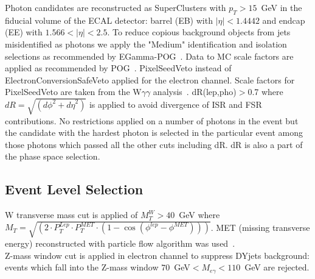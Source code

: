 Photon candidates are reconstructed as SuperClusters with 
$p_{T} > 15$~GeV in the fiducial volume of the ECAL detector:
barrel (EB) with $|\eta|<1.4442$ and endcap (EE) with 
$1.566 < |\eta| < 2.5$. To reduce copious background objects from jets misidentified as photons 
we apply the "Medium" identification and isolation selections as recommended by EGamma-POG~\cite{phoPOG}.
Data to MC scale factors are applied as recommended by POG~\cite{SFphoPOG}.
PixelSeedVeto instead of ElectronConversionSafeVeto applied for the electron channel. Scale factors for PixelSeedVeto are taken from the W$\gamma\gamma$ analysis~\cite{Wgg8TeV}.
dR(lep,pho)$>$0.7 where $dR=\sqrt{({d\phi}^2+{d\eta}^2)}$ 
is applied to avoid divergence of ISR and FSR contributions. No restrictions applied on a number of
 photons in the event but the candidate with the hardest photon is selected in the particular event among 
those photons which passed all the other cuts including dR. dR is also a part of the phase space selection.\\

\subsection{Event Level Selection}
W transverse mass cut is applied of $M_T^W>40$~GeV where $M_T=\sqrt{(2 \cdot P_T^{Lep} \cdot P_T^{MET} \cdot (1-\cos{(\phi^{lep}-\phi^{MET})}))}$. MET (missing transverse energy) reconstructed with particle flow algorithm was used~\cite{pfMET}. \\

Z-mass window cut is applied in electron channel to suppress DYjets background: events which fall into the Z-mass window $70$~GeV$<M_{e\gamma}<110$~GeV are rejected.\\

